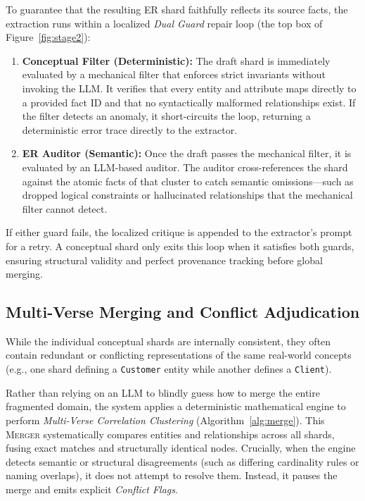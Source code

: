 To guarantee that the resulting ER shard faithfully reflects its source facts, the extraction runs within a localized \emph{Dual Guard} repair loop (the top box of Figure~\ref{fig:stage2}):
\begin{enumerate}
    \item \textbf{Conceptual Filter (Deterministic):} The draft shard is immediately evaluated by a mechanical filter that enforces strict invariants without invoking the LLM. It verifies that every entity and attribute maps directly to a provided fact ID and that no syntactically malformed relationships exist. If the filter detects an anomaly, it short-circuits the loop, returning a deterministic error trace directly to the extractor.
    \item \textbf{ER Auditor (Semantic):} Once the draft passes the mechanical filter, it is evaluated by an LLM-based auditor. The auditor cross-references the shard against the atomic facts of that cluster to catch semantic omissions—such as dropped logical constraints or hallucinated relationships that the mechanical filter cannot detect. 
\end{enumerate}
If either guard fails, the localized critique is appended to the extractor's prompt for a retry. A conceptual shard only exits this loop when it satisfies both guards, ensuring structural validity and perfect provenance tracking before global merging.

\subsection{Multi-Verse Merging and Conflict Adjudication}
\label{subsec:merge-adjudicate}

While the individual conceptual shards are internally consistent, they often contain redundant or conflicting representations of the same real-world concepts (e.g., one shard defining a \texttt{Customer} entity while another defines a \texttt{Client}).

Rather than relying on an LLM to blindly guess how to merge the entire fragmented domain, the system applies a deterministic mathematical engine to perform \emph{Multi-Verse Correlation Clustering} (Algorithm~\ref{alg:merge}). This \textsc{Merger} systematically compares entities and relationships across all shards, fusing exact matches and structurally identical nodes. Crucially, when the engine detects semantic or structural disagreements (such as differing cardinality rules or naming overlaps), it does not attempt to resolve them. Instead, it pauses the merge and emits explicit \emph{Conflict Flags}.

